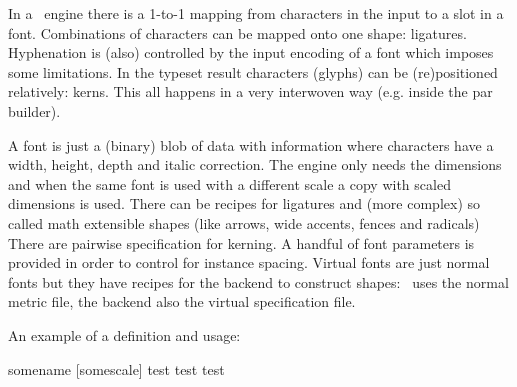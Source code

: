 



\definecolor[maincolor][g=.3]

\startdocument
  [title={COMPACT FONTS},
   banner={a different approach to scaling},
   location={context\enspace {\bf 2021}\enspace meeting}]

\starttitle[title=How \TEX\ uses fonts]

\startitemize
    \startitem
        In a \TEX\ engine there is a 1-to-1 mapping from characters in the input
        to a slot in a font.
    \stopitem
    \startitem
        Combinations of characters can be mapped onto one shape: ligatures.
    \stopitem
    \startitem
        Hyphenation is (also) controlled by the input encoding of a font which
        imposes some limitations.
    \stopitem
    \startitem
        In the typeset result characters (glyphs) can be (re)positioned relatively: kerns.
    \stopitem
    \startitem
        This all happens in a very interwoven way (e.g. inside the par builder).
    \stopitem
\stopitemize

\stoptitle

\starttitle[title=How traditional \TEX\ sees fonts]

\startitemize
    \startitem
        A font is just a (binary) blob of data with information where characters
        have a width, height, depth and italic correction.
    \stopitem
    \startitem
        The engine only needs the dimensions and when the same font is used with a
        different scale a copy with scaled dimensions is used.
    \stopitem
    \startitem
        There can be recipes for ligatures and (more complex) so called math extensible
        shapes (like arrows, wide accents, fences and radicals)
    \stopitem
    \startitem
        There are pairwise specification for kerning.
    \stopitem
    \startitem
        A handful of font parameters is provided in order to control for instance spacing.
    \stopitem
    \startitem
        Virtual fonts are just normal fonts but they have recipes for the backend to
        construct shapes: \TEX\ uses the normal metric file, the backend also the virtual
        specification file.
    \stopitem
\stopitemize

\blank[2*big]

An example of a definition and usage:

\starttyping
\font\cs somename [somescale]  test {\cs test} test
\stoptyping

